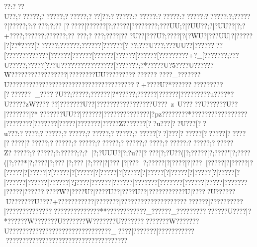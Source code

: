 {{{{{{{{{{{{{{{{{{{{{{{{{{{{{{{{{{{{{{{{{{{{{{{{{{{{{{{{{{{{{{{{{{{{{{{{{{{{{{{{{{{{{{{{{{{{{{{{{{{{{{{{{{{{{{{{{{{{{{{{{{{{{{{{{{{{{{{{{{{{{{{{{{{{{{{{{{{{{{{{{{{{{{{{{{{{{{{{{{{{{{{{{{{{{{{{{{{{{{{{{{{{{{{{{{{{{{{{{{{{{{{{{{{{{{{{{{{{{{{{{{{{{{{{{{{{{{{{{{{{{{{{{{{{{{{{{{{{{{{{{{{{{{{{{{{{{{{{{{{{{{{{{{{{{{{{{{{{{{{{{{{{{{{{{{{{{{{{{{{{{{{{{{{{{{{{{{{{{{{{{{{{{{{{{{{{{{{{{{{{{{{{{{{{{{{{{{{{{{{{{{{{{{{{{{{{{{{{{{{{{{{{{{{{{{{{{{{{{{{{{{{{{{{{{{{{{{{{{{{{{{{{{{{{{{{{{{{{{{{{{{{{{{{{{{{{{{{{{{{{{{{{{??:???U??;??????;??????;??????;???]??:??????:??????:??????:??????:??????:?;??????[?????;?:????;?;? ?
 [?? ???[??? ???[?;?????[??? ?????;???UU;?[?UU??;?[?UU??[?;?+???{?;?????{?;?????{?;??
??{?;?  ??{?;?  ??{?[???U??[???}U{?;?  ??{?[?(?WU{?[???UU|?[?????|?[??*????[??????;? ?????;? ?????[? ?????[? 
??;???U???;???UU??|????????[?????{????????[??????[??????[??????[??????[??????[?????{????+?_[???????;???U?????;?????[???U?????{? ?????{? ????[???????;?  *?????U?5????U???{???W???{??????{????????|?????{???UU???????????????
????_???????U???????????????????????????????????????+????U?*?????????????   ??[?  ??????_???? ?U??;?  ????;? ?????|?*?????;? ?????|? ?????|?  ?????? ??u???? *?U???? ?zW????
??]???????U??|?????????????????U???~z~U?????U??????U??|???????|?*
???????UU??|? ?????|??????????????|?pz????{????*??{???{?????????{???|?{???????[???????[?????|?{?????{?|?????Z???????[??u???[??U???[??u???:????? ;??????;??????;??????;??????;??????[??]???[??????[??????[?????[?????[??????;??????;??????;??????;??????;?????;??????:??????;??????Z??????;??????;?:?????;?;?  [?;?UUU?[?;?u??[????  [?;?U??([?;?????[?;????"[?;????([?;???* [?;???? [?;??? [?;??? [?;?? ?[?[??? 
[?[???
{?;?????[?[???? [?[???\?[?????[?[?????|?[?????|?[?????|?[?????|?[?????|?[?????|?[?????[?|?????[?|?????[?|?????[?|?????[?|?????{?|?????{?|?????{?|?j???{?|?????{?|?????{?|???????[???????[?????{?|?????|?{?????{?|?????|?{???? {?|????W{?|????U{?|????U??|????U??|?????{??????U|?????U??????U???????U????+?????? ?????|???????|???????????????????????? ??]??????????|????????? ????? ?????????????? **????????????_??????_???????????????U????|?*?? ????W???????U???????W???????U??????????????W???????U???????????????????????????????_????|???????|????????????????????????????????????????????????
}}}}}}}}}}}}}}}}}}}}}}}}}}}}}}}}}}}}}}}}}}}}}}}}}}}}}}}}}}}}}}}}}}}}}}}}}}}}}}}}}}}}}}}}}}}}}}}}}}}}}}}}}}}}}}}}}}}}}}}}}}}}}}}}}}}}}}}}}}}}}}}}}}}}}}}}}}}}}}}}}}}}}}}}}}}}}}}}}}}}}}}}}}}}}}}}}}}}}}}}}}}}}}}}}}}}}}}}}}}}}}}}}}}}}}}}}}}}}}}}}}}}}}}}}}}}}}}}}}}}}}}}}}}}}}}}}}}}}}}}}}}}}}}}}}}}}}}}}}}}}}}}}}}}}}}}}}}}}}}}}}}}}}}}}}}}}}}}}}}}}}}}}}}}}}}}}}}}}}}}}}}}}}}}}}}}}}}}}}}}}}}}}}}}}}}}}}}}}}}}}}}}}}}}}}}}}}}}}}}}}}}}}}}}}}}}}}}}}}}}}}}}}}}}}}}}}}}}}}}}}}}}}}}}}}}}}}}}}}}}}}}}}}}}}}}}}}}}}}}}}}}}}}}}}}}}}}}}}}}}}}}}}}}}}}}}}}}}}}}}}}}
